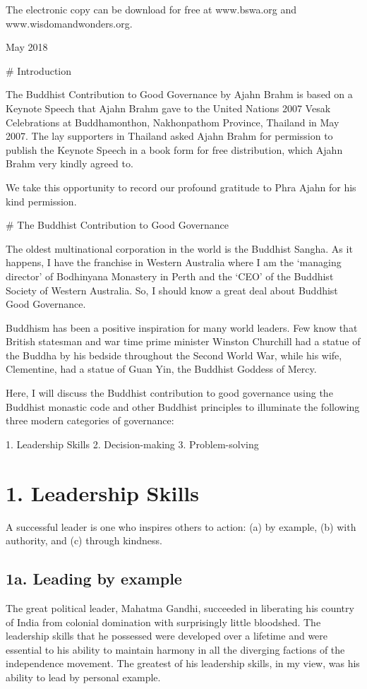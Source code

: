 \documentclass[12pt, openany]{book}
\begin{document}
The electronic copy can be download for free at www.bswa.org and www.wisdomandwonders.org.

May 2018


# Introduction

The Buddhist Contribution to Good Governance by Ajahn Brahm is based on a Keynote Speech that Ajahn Brahm gave to the United Nations 2007 Vesak Celebrations at Buddhamonthon, Nakhonpathom Province, Thailand in May 2007. The lay supporters in Thailand asked Ajahn Brahm for permission to publish the Keynote Speech in a book form for free distribution, which Ajahn Brahm very kindly agreed to.

We take this opportunity to record our profound gratitude to Phra Ajahn for his kind permission.

# The Buddhist Contribution to Good Governance

The oldest multinational corporation in the world is the Buddhist Sangha. As it happens, I have the franchise in Western Australia where I am the ‘managing director’ of Bodhinyana Monastery in Perth and the ‘CEO’ of the Buddhist Society of Western Australia. So, I should know a great deal about Buddhist Good Governance.

Buddhism has been a positive inspiration for many world leaders. Few know that British statesman and war time prime minister Winston Churchill had a statue of the Buddha by his bedside throughout the Second World War, while his wife, Clementine, had a statue of Guan Yin, the Buddhist Goddess of Mercy.

Here, I will discuss the Buddhist contribution to good governance using the Buddhist monastic code and other Buddhist principles to illuminate the following three modern categories of governance:

    1. Leadership Skills
    2. Decision-making
    3. Problem-solving

\chapter{1. Leadership Skills}

A successful leader is one who inspires others to action: (a) by example, (b) with authority, and (c) through kindness.

\section{1a. Leading by example}

The great political leader, Mahatma Gandhi, succeeded in liberating his country of India from colonial domination with surprisingly little bloodshed. The leadership skills that he possessed were developed over a lifetime and were essential to his ability to maintain harmony in all the diverging factions of the independence movement. The greatest of his leadership skills, in my view, was his ability to lead by personal example.
\end{document}
